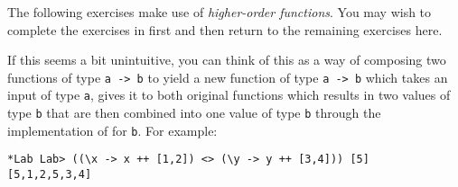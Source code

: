
\taskLine



\taskLine 

The following exercises make use of \emph{higher-order functions}. You may wish to complete the exercises in  first and then return to the remaining exercises here.


If this seems a bit unintuitive, you can think of this as a way of composing two functions of type \texttt{\small a -> b} to yield a new function of type \texttt{\small a -> b} which takes an input of type \texttt{\small a}, gives it to both original functions which results in two values of type \texttt{\small b} that are then combined into one value of type \texttt{\small b} through the implementation of \haskellIn{(<>)} for \texttt{\small b}. For example:
\begin{verbatim}
*Lab Lab> ((\x -> x ++ [1,2]) <> (\y -> y ++ [3,4])) [5]
[5,1,2,5,3,4]
\end{verbatim}

\taskLine 
